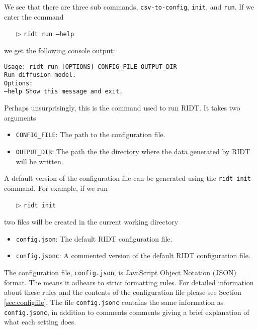 \documentclass[]{article}
\def\code#1{\texttt{#1}}
\begin{document}
\noindent We see that there are three sub commands, \code{csv-to-config},
\code{init}, and \code{run}. If we enter the command 

\begin{itemize}
    \item[$\triangleright$] \code{ridt run --help}
\end{itemize}
we get the following console output:\\

\begin{addmargin}[1.5em]{1em}
\begin{tcolorbox}[enhanced,width=6in,fontupper=\bfseries,drop shadow
southwest,sharp corners, before upper={\parindent15pt}]
\noindent\code{Usage: ridt run [OPTIONS] CONFIG\_FILE OUTPUT\_DIR}\\

\indent\code{Run diffusion model.}\\

\noindent\code{Options:}\\
\indent\code{--help  Show this message and exit.}
\end{tcolorbox}
\end{addmargin}
\medskip

\noindent Perhaps unsurprisingly, this is the command used to run RIDT. It takes
two arguments
\begin{itemize}
    \item \code{CONFIG\_FILE}: The path to the configuration file.
    \item \code{OUTPUT\_DIR}: The path the the directory where the data
    generated by RIDT will be written.
\end{itemize}

\noindent A default version of the configuration file can be generated using the
\code{ridt init} command. For example, if we run
\begin{itemize}
    \item[$\triangleright$] \code{ridt init}
\end{itemize}
two files will be created in the current working directory
\begin{itemize}
    \item \code{config.json}: The default RIDT configuration file.
    \item \code{config.jsonc}: A commented version of the default RIDT
    configuration file.
\end{itemize}

\noindent The configuration file, \code{config.json}, is JavaScript Object
Notation (JSON) format. The means it adhears to strict formatting rules. For
detailed information about these rules and the contents of the configuration
file please see Section \ref{sec:configfile}. The file \code{config.jsonc}
contains the same information as \code{config.jsonc}, in addition to comments
comments giving a brief explanation of what each setting does.\\
\end{document}
